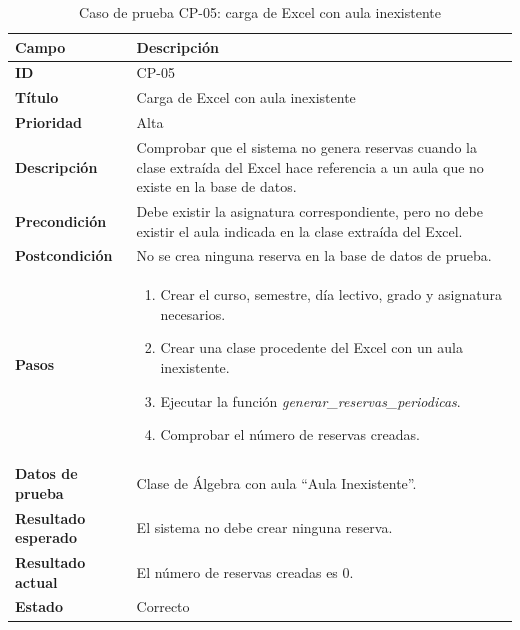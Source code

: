 \begin{table}[H]
	\centering
	\small
	\renewcommand{\arraystretch}{1.2}
	\begin{tabularx}{\textwidth}{@{}p{3.5cm}X@{}}
		\toprule
		\textbf{Campo} & \textbf{Descripción} \\
		\midrule
		\textbf{ID} & CP-05 \\
		\textbf{Título} & Carga de Excel con aula inexistente \\
		\textbf{Prioridad} & Alta \\
		\textbf{Descripción} & Comprobar que el sistema no genera reservas cuando la clase extraída del Excel hace referencia a un aula que no existe en la base de datos. \\
		\textbf{Precondición} & Debe existir la asignatura correspondiente, pero no debe existir el aula indicada en la clase extraída del Excel. \\
		\textbf{Postcondición} & No se crea ninguna reserva en la base de datos de prueba. \\
		\textbf{Pasos} &
		\begin{enumerate}
			\item Crear el curso, semestre, día lectivo, grado y asignatura necesarios.
			\item Crear una clase procedente del Excel con un aula inexistente.
			\item Ejecutar la función \textit{generar\_reservas\_periodicas}.
			\item Comprobar el número de reservas creadas.
		\end{enumerate} \\
		\textbf{Datos de prueba} & Clase de Álgebra con aula ``Aula Inexistente''. \\
		\textbf{Resultado esperado} & El sistema no debe crear ninguna reserva. \\
		\textbf{Resultado actual} & El número de reservas creadas es 0. \\
		\textbf{Estado} & Correcto \\
		\bottomrule
	\end{tabularx}
	\caption{Caso de prueba CP-05: carga de Excel con aula inexistente}
	\label{tab}
\end{table}

